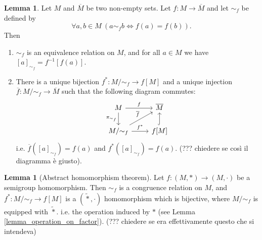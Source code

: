 \documentclass[12pt,a4paper]{report}
\theoremstyle{definition}
\newtheorem{lemma}[theorem]{Lemma}
\theoremstyle{num.custom-title}
\newcommand{\ol}{\overline}
\renewcommand{\iff}{\Leftrightarrow}
\begin{document}
\begin{lemma}
Let $M$ and $\ol{M}$ be two non-empty sets. Let $f: M \to \ol{M}$ and let $\sim_f$ be defined by
\[
\forall a,b \in M \ (a \sim_f b \iff f(a) = f(b)).
\]
Then
\begin{enumerate}
\item $\sim_f$ is an equivalence relation on $M$, and for all $a \in M$ we have $[a]_{\sim_f} = f^{-1}[f(a)]$.
\item There is a unique bijection $f^* : M/{\sim_f} \to f[M]$ and a unique injection $\ol{f}: M/{\sim_f} \to \ol{M}$ such that the following diagram commutes:
\[
\begin{tikzcd}
M \arrow{r}{f} \arrow[swap]{d}{\pi_{\sim_f}} & \ol{M} \\
M/{\sim_f} \arrow{ur}{\ol{f}} \arrow{r}{f^*} & f[M] \arrow[hookrightarrow]{u}{}
\end{tikzcd}
\]
i.e. $\ol{f}([a]_{\sim_f}) = f(a)$ and $f^*([a]_{\sim_f})=f(a)$. (??? chiedere se così il diagramma è giusto).
\end{enumerate}
\end{lemma}

\begin{lemma}[Abstract homomorphism theorem]
Let $f: (M,*) \to (M,\cdot)$ be a semigroup homomorphism. Then $\sim_f$ is a congruence relation on $M$, and $f^* \colon M/{\sim_f} \to f[M]$ is a $(\tilde{*}, \cdot)$ homomorphism which is bijective, where $M/{\sim_f}$ is equipped with $\tilde{*}$. i.e. the operation induced by $*$ (see Lemma \ref{lemma_operation_on_factor}). (??? chiedere se era effettivamente questo che si intendeva)
\end{lemma}
\end{document}
